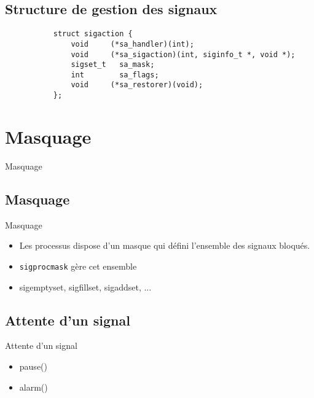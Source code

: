 \begin{frame}[containsverbatim]{\sectitle}
\def\subsectitle{Structure de gestion des signaux}
\subsection{\subsectitle}
\begin{verbatim}
           struct sigaction {
               void     (*sa_handler)(int);
               void     (*sa_sigaction)(int, siginfo_t *, void *);
               sigset_t   sa_mask;
               int        sa_flags;
               void     (*sa_restorer)(void);
           };
\end{verbatim}
\end{frame}

\def\sectitle{Masquage}
\section{\sectitle}
\begin{frame}{\sectitle}
\def\subsectitle{Masquage}
\subsection{\subsectitle}
\begin{block}{\subsectitle}
\begin{itemize}
    \item Les processus dispose d'un masque qui défini l'ensemble des signaux
    bloqués.
    \item \texttt{sigprocmask} gère cet ensemble
    \item sigemptyset, sigfillset, sigaddset, ...
\end{itemize}
\end{block}

\def\subsectitle{Attente d'un signal}
\subsection{\subsectitle}
\begin{block}{\subsectitle}
\begin{itemize}
    \item pause()
    \item alarm()
\end{itemize}
\end{block}

\end{frame}



